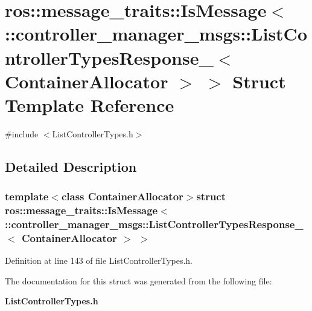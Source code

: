 \section{ros\-:\-:message\-\_\-traits\-:\-:\-Is\-Message$<$ \-:\-:controller\-\_\-manager\-\_\-msgs\-:\-:\-List\-Controller\-Types\-Response\-\_\-$<$ \-Container\-Allocator $>$ $>$ \-Struct \-Template \-Reference}
\label{structros_1_1message__traits_1_1IsMessage_3_01_1_1controller__manager__msgs_1_1ListControllerTyp344ad82d0574179822d5d290d3839899}


{\ttfamily \#include $<$\-List\-Controller\-Types.\-h$>$}



\subsection{\-Detailed \-Description}
\subsubsection*{template$<$class Container\-Allocator$>$struct ros\-::message\-\_\-traits\-::\-Is\-Message$<$ \-::controller\-\_\-manager\-\_\-msgs\-::\-List\-Controller\-Types\-Response\-\_\-$<$ Container\-Allocator $>$ $>$}



\-Definition at line 143 of file \-List\-Controller\-Types.\-h.



\-The documentation for this struct was generated from the following file\-:\begin{DoxyCompactItemize}
\item 
{\bf \-List\-Controller\-Types.\-h}\end{DoxyCompactItemize}
